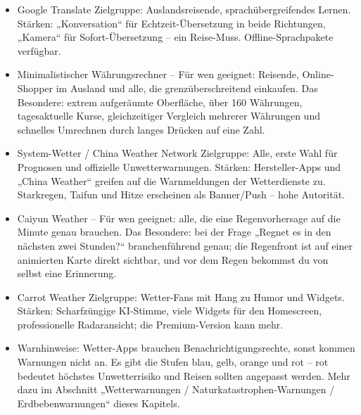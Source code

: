 
\begin{itemize}
  \item Google Translate Zielgruppe: Auslandsreisende, sprachübergreifendes Lernen. Stärken: „Konversation“ für Echtzeit-Übersetzung in beide Richtungen, „Kamera“ für Sofort-Übersetzung – ein Reise-Muss. Offline-Sprachpakete verfügbar.
\end{itemize}


\begin{itemize}
  \item Minimalistischer Währungsrechner – Für wen geeignet: Reisende, Online-Shopper im Ausland und alle, die grenzüberschreitend einkaufen. Das Besondere: extrem aufgeräumte Oberfläche, über 160 Währungen, tagesaktuelle Kurse, gleichzeitiger Vergleich mehrerer Währungen und schnelles Umrechnen durch langes Drücken auf eine Zahl.
\end{itemize}


\begin{itemize}
  \item System-Wetter / China Weather Network Zielgruppe: Alle, erste Wahl für Prognosen und offizielle Unwetterwarnungen. Stärken: Hersteller-Apps und „China Weather“ greifen auf die Warnmeldungen der Wetterdienste zu. Starkregen, Taifun und Hitze erscheinen als Banner/Push – hohe Autorität.
  \item Caiyun Weather – Für wen geeignet: alle, die eine Regenvorhersage auf die Minute genau brauchen. Das Besondere: bei der Frage „Regnet es in den nächsten zwei Stunden?“ branchenführend genau; die Regenfront ist auf einer animierten Karte direkt sichtbar, und vor dem Regen bekommst du von selbst eine Erinnerung.
  \item Carrot Weather Zielgruppe: Wetter-Fans mit Hang zu Humor und Widgets. Stärken: Scharfzüngige KI-Stimme, viele Widgets für den Homescreen, professionelle Radaransicht; die Premium-Version kann mehr.
  \item Warnhinweise: Wetter-Apps brauchen Benachrichtigungsrechte, sonst kommen Warnungen nicht an. Es gibt die Stufen blau, gelb, orange und rot – rot bedeutet höchstes Unwetterrisiko und Reisen sollten angepasst werden. Mehr dazu im Abschnitt „Wetterwarnungen / Naturkatastrophen-Warnungen / Erdbebenwarnungen“ dieses Kapitels.
\end{itemize}

